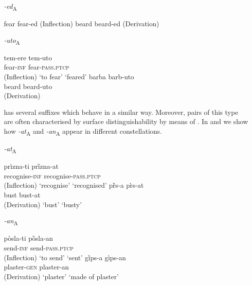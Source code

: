 \documentclass[output=paper, colorlinks, citecolor=brown, newtxmath]{langsci/langscibook}
\begin{document}
\begin{exe} \label{ex:simonovic:1}
	\ex {} \textit{-ed}\textsubscript{A}
	\begin{xlist}
		\ex fear fear-ed \hfill{(Inflection)}
		\ex beard beard-ed \hfill{(Derivation)}
	\end{xlist}
\end{exe}
\begin{exe}\label{ex:simonovic:2}
	\ex {} \textit{-uto}\textsubscript{A}
	\begin{xlist}
	    \ex \gll tem-ere tem-uto \\
        fear-\textsc{inf} fear-\textsc{pass.ptcp} \\ \hfill{(Inflection)}
		\glt `to fear' `feared'
		\ex \gll barba \hspace{0.15cm} barb-uto \\
        beard {} beard-uto\\\hfill{(Derivation)}	\end{xlist}
	\end{exe}


\noindent {} has several suffixes which behave in a similar way. Moreover,  pairs of this type are often characterised by surface distinguishability by means of . In  and  we show how  \textit{-at}\textsubscript{A} and \textit{-an}\textsubscript{A} appear in different constellations.

\ea {} \textit{-at}\textsubscript{A} \label{ex:simonovic:3} \begin{xlist} \ex \gll prìzna-ti prȉzna-at
\\
recognise-\textsc{inf} recognise-\textsc{pass.ptcp} \\ \hfill{(Inflection)}
		\glt `recognise' \hspace{0.4cm} `recognised'
		\ex \gll pȑs-a { } pr̀s-at \\
bust {} bust-at\\ \hfill{(Derivation)}
		\glt `bust'  \hspace{0.06cm} `busty'
	\end{xlist}
\z


\ea {} \textit{-an}\textsubscript{A}\label{ex:simonovic:4}
\begin{xlist}
\ex \gll pòsla-ti pȍsla-an\\
send-\textsc{inf} send-\textsc{pass.ptcp}\\ \hfill{(Inflection)}
		\glt `to send'  `sent'
		\ex \gll gȉps-a gìps-an \\
plaster-\textsc{gen} plaster-an\\ \hfill{(Derivation)}
 		\glt `plaster' \hspace{0.45cm} `made of plaster'

	\end{xlist}
\z
\end{document}
